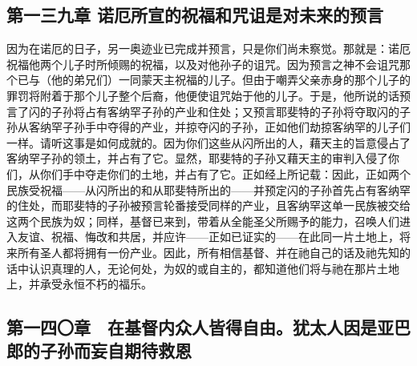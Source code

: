 
\subsection{第一三九章 诺厄所宣的祝福和咒诅是对未来的预言}

因为在诺厄的日子，另一奥迹业已完成并预言，只是你们尚未察觉。那就是：诺厄祝福他两个儿子时所倾赐的祝福，以及对他孙子的诅咒。因为预言之神不会诅咒那个已与（他的弟兄们）一同蒙天主祝福的儿子。但由于嘲弄父亲赤身的那个儿子的罪罚将附着于那个儿子整个后裔，他便使诅咒始于他的儿子。于是，他所说的话预言了闪的子孙将占有客纳罕子孙的产业和住处；又预言耶斐特的子孙将夺取闪的子孙从客纳罕子孙手中夺得的产业，并掠夺闪的子孙，正如他们劫掠客纳罕的儿子们一样。请听这事是如何成就的。因为你们这些从闪所出的人，藉天主的旨意侵占了客纳罕子孙的领土，并占有了它。显然，耶斐特的子孙又藉天主的审判入侵了你们，从你们手中夺走你们的土地，并占有了它。正如经上所记载：因此，正如两个民族受祝福——从闪所出的和从耶斐特所出的——并预定闪的子孙首先占有客纳罕的住处，而耶斐特的子孙被预言轮番接受同样的产业，且客纳罕这单一民族被交给这两个民族为奴；同样，基督已来到，带着从全能圣父所赐予的能力，召唤人们进入友谊、祝福、悔改和共居，并应许——正如已证实的——在此同一片土地上，将来所有圣人都将拥有一份产业。因此，所有相信基督、并在祂自己的话及祂先知的话中认识真理的人，无论何处，为奴的或自主的，都知道他们将与祂在那片土地上，并承受永恒不朽的福乐。\par


\subsection{第一四〇章　在基督内众人皆得自由。犹太人因是亚巴郎的子孙而妄自期待救恩}

